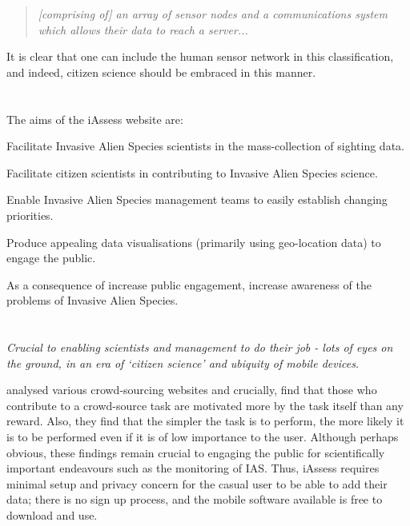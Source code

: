\documentclass[10pt,psfig,letterpaper,twocolumn]{article}
\begin{document}
\begin{quote}\em{\footnotesize
[comprising of] an array of sensor nodes and a communications system which allows their data to reach a server...
}
\end{quote}

It is clear that one can include the human sensor network in this classification, and indeed, citizen science should be embraced in this manner.


\section*{}

The aims of the iAssess website are:
\begin{enumerate*}
\item Facilitate Invasive Alien Species scientists in the mass-collection of sighting data.
\item Facilitate citizen scientists in contributing to Invasive Alien Species science.
\item Enable Invasive Alien Species management teams to easily establish changing priorities.
\item Produce appealing data visualisations (primarily using geo-location data) to engage the public.
\item As a consequence of increase public engagement, increase awareness of the problems of Invasive Alien Species.
\end{enumerate*}

\section*{}

\emph{Crucial to enabling scientists and management to do their job - lots of eyes on the ground, in an era of `citizen science' and ubiquity of mobile devices.}

\citet{Wightman:2010un} analysed various crowd-sourcing websites and crucially, find that those who contribute to a crowd-source task are motivated more by the task itself than any reward. Also, they find that the simpler the task is to perform, the more likely it is to be performed even if it is of low importance to the user. Although perhaps obvious, these findings remain crucial to engaging the public for scientifically important endeavours such as the monitoring of IAS. Thus, iAssess requires minimal setup and privacy concern for the casual user to be able to add their data; there is no sign up process, and the mobile software available is free to download and use.
\end{document}
